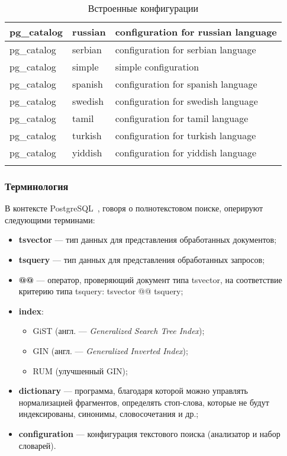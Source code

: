 \begin{longtable}{|l|l|l|}
    pg\_catalog & russian    & configuration for russian language    \\ \hline
    pg\_catalog & serbian    & configuration for serbian language    \\ \hline
    pg\_catalog & simple     & simple configuration                  \\ \hline
    pg\_catalog & spanish    & configuration for spanish language    \\ \hline
    pg\_catalog & swedish    & configuration for swedish language    \\ \hline
    pg\_catalog & tamil      & configuration for tamil language      \\ \hline
    pg\_catalog & turkish    & configuration for turkish language    \\ \hline
    pg\_catalog & yiddish    & configuration for yiddish language    \\ \hline
    \caption{Встроенные конфигурации}
    \label{standard-cfg}
\end{longtable}

\subsubsection{Терминология}

В контексте PostgreSQL~\cite{PostgresDocs}, говоря о полнотекстовом поиске, оперируют следующими терминами:

\begin{itemize}
    \item{\textbf{tsvector}} --- тип данных для представления обработанных документов;
    \item{\textbf{tsquery}} --- тип данных для представления обработанных запросов;
    \item{\textbf{@@}} --- оператор, проверяющий документ типа tsvector, на соответствие критерию типа tsquery: tsvector @@ tsquery;
    \item{\textbf{index}}:
          \begin{itemize}
              \item GiST (англ. --- \textit{Generalized Search Tree Index});
              \item GIN (англ. --- \textit{Generalized Inverted Index});
              \item RUM (улучшенный GIN);
          \end{itemize}
    \item{\textbf{dictionary}} --- программа, благодаря которой можно управлять нормализацией фрагментов, определять стоп-слова, которые не будут индексированы, синонимы, словосочетания и др.;
    \item{\textbf{configuration}} --- конфигурация текстового поиска (анализатор и набор словарей).
\end{itemize}

